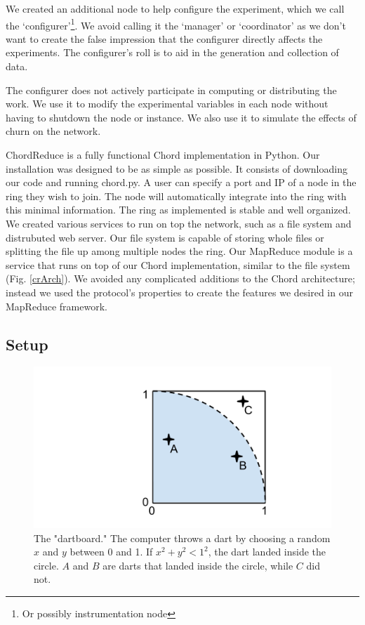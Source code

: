 \documentclass[10pt, conference, compsocconf]{IEEEtran}
\begin{document}
We created an additional node to help configure the experiment, which we call the `configurer'\footnote{Or possibly instrumentation node}.  We avoid calling it the `manager' or `coordinator' as we don't want to create the false impression that the configurer directly affects the experiments.  The configurer's roll is to aid in the generation and collection of data. 

The configurer does not actively participate in computing or distributing the work.  We use it to modify the experimental variables in each node without having to shutdown the node or instance. We also use it to simulate the effects of churn on the network.


ChordReduce is a fully functional Chord implementation in Python.  Our installation was designed to be as simple as possible.  It consists of downloading our code \cite{code} and running chord.py.  A user can specify a port and IP of a node in the ring they wish to join.  The node will automatically integrate into the ring with this minimal information.  The ring as implemented is stable and well organized.  We created various services to run on top the network, such as a file system and distrubuted web server.  Our file system is capable of storing whole files or splitting the file up among multiple nodes the ring.  Our MapReduce module is a service that runs on top of our Chord implementation, similar to the file system (Fig. \ref{crArch}).  We avoided any complicated additions to the Chord architecture; instead we used the protocol's properties to create the features we desired in our MapReduce framework. 





\subsection{Setup}

\begin{figure}
    \includegraphics[width=\linewidth]{dartboard}
    \caption{The "dartboard." The computer throws a dart by choosing a random $x$ and $y$ between 0 and 1.  If $x^{2} + y^{2} < 1^{2} $, the dart landed inside the circle.  $A$ and $B$ are darts that landed inside the circle, while $C$ did not.}
    \label{dartboard}
\end{figure}
\end{document}
